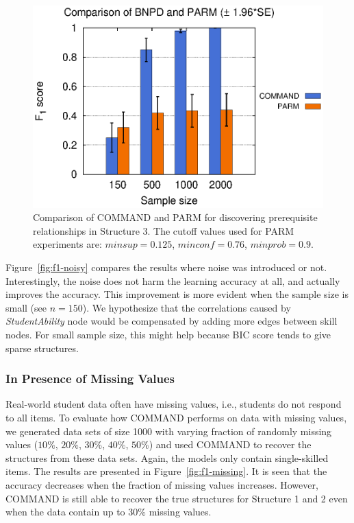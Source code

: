 \documentclass{edm_template}
\newcommand{\hl}[1]{\colorbox{yellow}{#1}}
\begin{document}
					\begin{figure}[!th]
						\begin{center}
							\centering
							\includegraphics[width=0.6\linewidth]{figures/F1_parm.eps}
						\end{center}
						\caption{Comparison of COMMAND and PARM for discovering prerequisite relationships in Structure 3. The cutoff values used for PARM experiments are: $ minsup=0.125$, $minconf=0.76$, $minprob=0.9$.}
						\label{fig:f1-parm} 
					\end{figure} 			
	
	Figure~\ref{fig:f1-noisy} compares the results where noise was introduced or not.
	Interestingly, the noise does not harm the learning accuracy at all, and actually improves the accuracy.
	This improvement is more evident when the sample size is small (see $n=150$).
	We hypothesize that the correlations caused by \emph{StudentAbility} node would be compensated by adding more edges between skill nodes. 
	For small sample size, this might help because BIC score tends to give sparse structures.

	
	\subsubsection{In Presence of Missing Values}
	Real-world student data often have missing values, i.e., students do not respond to all items. %
	To evaluate how COMMAND performs on data with missing values, we generated data sets of size 1000 with varying fraction of randomly missing values ($10\%$, $20\%$, $30\%$, $40\%$, $50\%$) and used COMMAND to recover the structures from these data sets. Again, the models only contain single-skilled items.  
	The results are presented in Figure~\ref{fig:f1-missing}.
	It is seen that the accuracy decreases when the fraction of missing values increases. 
	However, COMMAND is still able to recover the true structures for Structure 1 and 2 even when the data contain up to $30\%$ missing values. 
	
\end{document}
